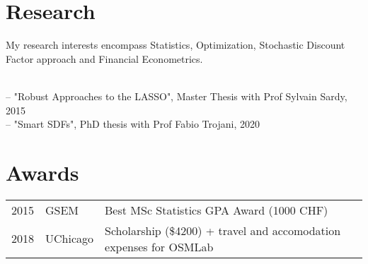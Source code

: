 \documentclass[]{deedy-resume-openfont}
\begin{document}
\begin{minipage}[t]{0.66\textwidth}

\section{Research}
My research interests encompass Statistics, Optimization, Stochastic Discount Factor approach and Financial Econometrics. 
\sectionsep

\\ \small
-- "Robust Approaches to the LASSO", Master Thesis with Prof Sylvain Sardy, 2015 \\
-- "Smart SDFs", PhD thesis with Prof Fabio Trojani, 2020 \\


\section{Awards}
\begin{tabular}{rll}
2015	     & GSEM & Best MSc Statistics GPA Award (1000 CHF)\\
2018         & UChicago & Scholarship (\$4200) + travel and accomodation expenses for OSMLab
\end{tabular}
\sectionsep


% 

\end{minipage} 
\end{document}
